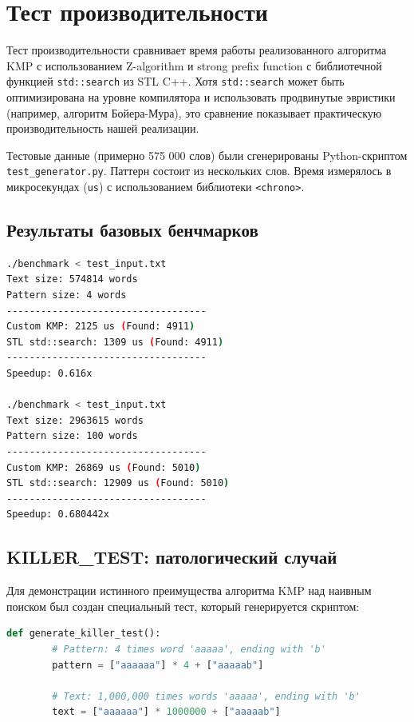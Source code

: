 \section{Тест производительности}

Тест производительности сравнивает время работы реализованного алгоритма KMP с использованием Z-algorithm и strong prefix function с библиотечной функцией \texttt{std::search} из STL C++. Хотя \texttt{std::search} может быть оптимизирована на уровне компилятора и использовать продвинутые эвристики (например, алгоритм Бойера-Мура), это сравнение показывает практическую производительность нашей реализации.

Тестовые данные (примерно 575 000 слов) были сгенерированы Python-скриптом \texttt{test\_generator.py}. Паттерн состоит из нескольких слов. Время измерялось в микросекундах (\texttt{us}) с использованием библиотеки \texttt{<chrono>}.

\subsection{Результаты базовых бенчмарков}

\begin{lstlisting}[language=bash]
./benchmark < test_input.txt
Text size: 574814 words
Pattern size: 4 words
-----------------------------------
Custom KMP: 2125 us (Found: 4911)
STL std::search: 1309 us (Found: 4911)
-----------------------------------
Speedup: 0.616x

./benchmark < test_input.txt
Text size: 2963615 words
Pattern size: 100 words
-----------------------------------
Custom KMP: 26869 us (Found: 5010)
STL std::search: 12909 us (Found: 5010)
-----------------------------------
Speedup: 0.680442x
\end{lstlisting}

\subsection{KILLER\_TEST: патологический случай}

Для демонстрации истинного преимущества алгоритма KMP над наивным поиском был создан специальный тест, который генерируется скриптом:

\begin{lstlisting}[language=Python]
def generate_killer_test():
        # Pattern: 4 times word 'aaaaa', ending with 'b'
        pattern = ["aaaaaa"] * 4 + ["aaaaab"]
        
        # Text: 1,000,000 times words 'aaaaa', ending with 'b'
        text = ["aaaaaa"] * 1000000 + ["aaaaab"]
\end{lstlisting}

